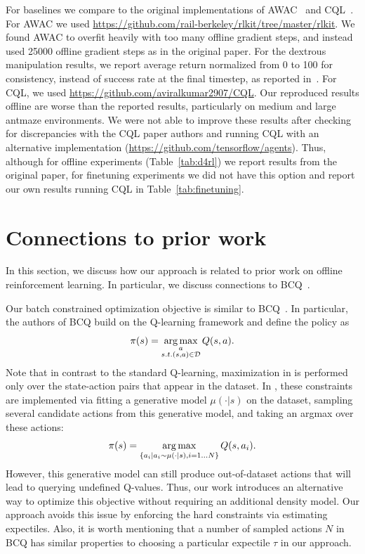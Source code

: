 \documentclass{article} %
\begin{document}
For baselines we compare to the original implementations of AWAC~\citep{nair2020awac} and CQL~\citep{kumar2020conservative}. For AWAC we used \url{https://github.com/rail-berkeley/rlkit/tree/master/rlkit}. We found AWAC to overfit heavily with too many offline gradient steps, and instead used 25000 offline gradient steps as in the original paper. For the dextrous manipulation results, we report average return normalized from 0 to 100 for consistency, instead of success rate at the final timestep, as reported in~\citet{nair2020awac}. For CQL, we used \url{https://github.com/aviralkumar2907/CQL}. Our reproduced results offline are worse than the reported results, particularly on medium and large antmaze environments. We were not able to improve these results after checking for discrepancies with the CQL paper authors and running CQL with an alternative implementation (\url{https://github.com/tensorflow/agents}). Thus, although for offline experiments (Table~\ref{tab:d4rl}) we report results from the original paper, for finetuning experiments we did not have this option and report our own results running CQL in Table~\ref{tab:finetuning}.

\section{Connections to prior work}
In this section, we discuss how our approach is related to prior work on offline reinforcement learning. In particular, we discuss connections to BCQ~\cite{fujimoto2019off}.

Our batch constrained optimization objective is similar to BCQ~\citep{fujimoto2019off}. In particular, the authors of BCQ build on the Q-learning framework and define the policy as
\begin{equation}
\label{eqn:bcq_policy}
\pi(s) = \operatorname*{arg\,max}_{\substack{a\\s.t.(s, a)\in \mathcal{D}}}Q(s,a).
\end{equation}
Note that in contrast to the standard Q-learning, maximization in  is performed only over the state-action pairs that appear in the dataset. In \cite{fujimoto2019off}, these constraints are implemented via fitting a generative model $\mu(\cdot|s)$ on the dataset, sampling several candidate actions from this generative model, and taking an argmax over these actions:
$$
\pi(s) = \operatorname*{arg\,max}_{\{a_i| a_i \sim \mu(\cdot|s), i=1\ldots N\}}Q(s,a_i).
$$
However, this generative model can still produce out-of-dataset actions that will lead to querying undefined Q-values. Thus, our work introduces an alternative way to optimize this objective without requiring an additional density model. Our approach avoids this issue by enforcing the hard constraints via estimating expectiles. Also, it is worth mentioning that a number of sampled actions $N$ in BCQ has similar properties to choosing a particular expectile $\tau$ in our approach.
\end{document}

